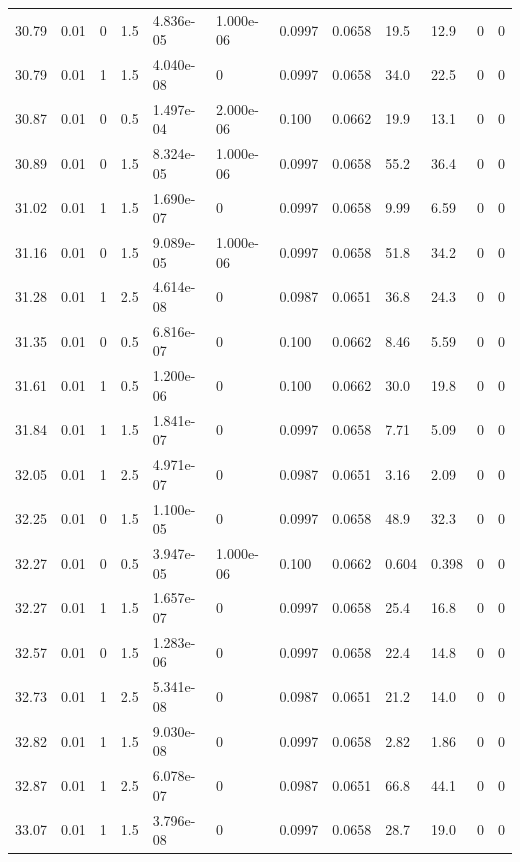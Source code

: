 \documentclass[preview]{standalone}
\begin{document}
{{{{{{{\begin{tabular}{L{1.2cm}C{1.2cm} C{0.3cm}C{0.5cm} C{1.4cm}C{1.4cm} C{1.4cm}C{1.4cm} C{1.6cm}C{1.6cm} C{1.6cm}C{1.6cm}}
  30.79  &  0.01  & 0     & 1.5 &  4.836e-05  & 1.000e-06  &  0.0997&   0.0658& 19.5 & 12.9   &  0 & 0  \\ 
  30.79  &  0.01  & 1     & 1.5 &  4.040e-08  & 0  &  0.0997&   0.0658& 34.0 & 22.5   &  0 & 0  \\ 
  30.87  &  0.01  & 0     & 0.5 &  1.497e-04  & 2.000e-06  &  0.100&   0.0662& 19.9 & 13.1   &  0 & 0  \\ 
  30.89  &  0.01  & 0     & 1.5 &  8.324e-05  & 1.000e-06  &  0.0997&   0.0658& 55.2 & 36.4   &  0 & 0  \\ 
  31.02  &  0.01  & 1     & 1.5 &  1.690e-07  & 0  &  0.0997&   0.0658& 9.99 & 6.59   &  0 & 0  \\ 
  31.16  &  0.01  & 0     & 1.5 &  9.089e-05  & 1.000e-06  &  0.0997&   0.0658& 51.8 & 34.2   &  0 & 0  \\ 
  31.28  &  0.01  & 1     & 2.5 &  4.614e-08  & 0  &  0.0987&   0.0651& 36.8 & 24.3   &  0 & 0  \\ 
  31.35  &  0.01  & 0     & 0.5 &  6.816e-07  & 0  &  0.100&   0.0662& 8.46 & 5.59   &  0 & 0  \\ 
  31.61  &  0.01  & 1     & 0.5 &  1.200e-06  & 0  &  0.100&   0.0662& 30.0 & 19.8   &  0 & 0  \\ 
  31.84  &  0.01  & 1     & 1.5 &  1.841e-07  & 0  &  0.0997&   0.0658& 7.71 & 5.09   &  0 & 0  \\ 
  32.05  &  0.01  & 1     & 2.5 &  4.971e-07  & 0  &  0.0987&   0.0651& 3.16 & 2.09   &  0 & 0  \\ 
  32.25  &  0.01  & 0     & 1.5 &  1.100e-05  & 0  &  0.0997&   0.0658& 48.9 & 32.3   &  0 & 0  \\ 
  32.27  &  0.01  & 0     & 0.5 &  3.947e-05  & 1.000e-06  &  0.100&   0.0662& 0.604 & 0.398   &  0 & 0  \\ 
  32.27  &  0.01  & 1     & 1.5 &  1.657e-07  & 0  &  0.0997&   0.0658& 25.4 & 16.8   &  0 & 0  \\ 
  32.57  &  0.01  & 0     & 1.5 &  1.283e-06  & 0  &  0.0997&   0.0658& 22.4 & 14.8   &  0 & 0  \\ 
  32.73  &  0.01  & 1     & 2.5 &  5.341e-08  & 0  &  0.0987&   0.0651& 21.2 & 14.0   &  0 & 0  \\ 
  32.82  &  0.01  & 1     & 1.5 &  9.030e-08  & 0  &  0.0997&   0.0658& 2.82 & 1.86   &  0 & 0  \\ 
  32.87  &  0.01  & 1     & 2.5 &  6.078e-07  & 0  &  0.0987&   0.0651& 66.8 & 44.1   &  0 & 0  \\ 
  33.07  &  0.01  & 1     & 1.5 &  3.796e-08  & 0  &  0.0997&   0.0658& 28.7 & 19.0   &  0 & 0  \\ 

\end{tabular}}}}}}}}
\end{document}
